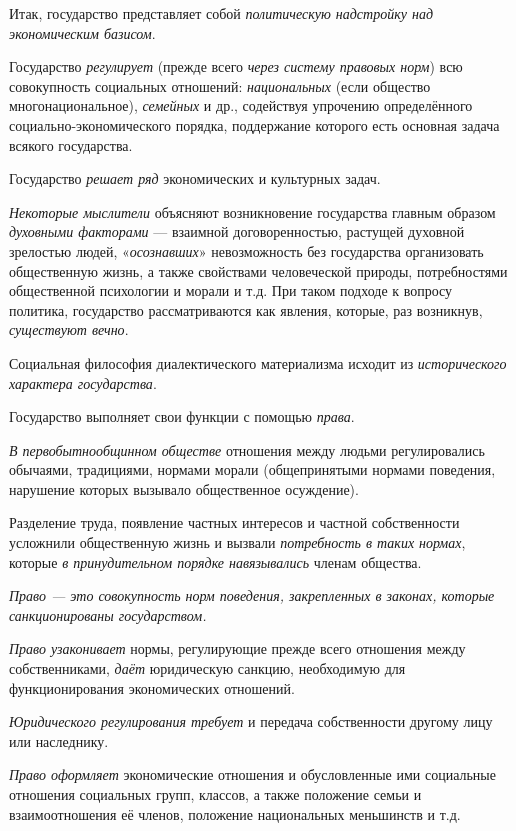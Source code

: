 \documentclass[a4paper,14pt,russian]{extreport}
\begin{document}
Итак, государство представляет собой \emph{политическую надстройку над экономическим базисом}.

Государство \emph{регулирует} (прежде всего \emph{через систему правовых норм}) всю совокупность социальных отношений: \emph{национальных} (если общество многонациональное), \emph{семейных} и др., содействуя упрочению определённого социально-экономического порядка, поддержание которого есть основная задача всякого государства.

Государство \emph{решает ряд} экономических и культурных задач.

\emph{Некоторые мыслители} объясняют возникновение государства главным образом \emph{духовными факторами} --- взаимной договоренностью, растущей духовной зрелостью людей, «\emph{осознавших}» невозможность без государства организовать общественную жизнь, а также свойствами человеческой природы, потребностями общественной психологии и морали и т.д. При таком подходе к вопросу политика, государство рассматриваются как явления, которые, раз возникнув, \emph{существуют вечно}.

Социальная философия диалектического материализма исходит из \emph{исторического характера государства}.

Государство выполняет свои функции с помощью \emph{права}.

\emph{В первобытнообщинном обществе} отношения между людьми регулировались обычаями, традициями, нормами морали (общепринятыми нормами поведения, нарушение которых вызывало общественное осуждение).

Разделение труда, появление частных интересов и частной собственности усложнили общественную жизнь и вызвали \emph{потребность в таких нормах}, которые \emph{в принудительном порядке навязывались} членам общества.

\emph{Право --- это совокупность норм поведения, закрепленных в законах, которые санкционированы государством.}

\emph{Право узаконивает} нормы, регулирующие прежде всего отношения между собственниками, \emph{даёт} юридическую санкцию, необходимую для функционирования экономических отношений.

\emph{Юридического регулирования требует} и передача собственности другому лицу или наследнику.

\emph{Право оформляет} экономические отношения и обусловленные ими социальные отношения социальных групп, классов, а также положение семьи и взаимоотношения её членов, положение национальных меньшинств и т.д.
\end{document}
